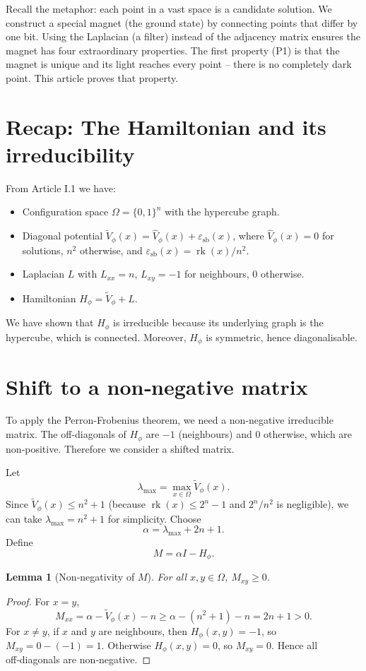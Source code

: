 \documentclass[11pt,a4paper]{article}
\newtheorem{lemma}[theorem]{Lemma}
\begin{document}
Recall the metaphor: each point in a vast space is a candidate solution. We construct a special magnet (the ground state) by connecting points that differ by one bit. Using the Laplacian (a filter) instead of the adjacency matrix ensures the magnet has four extraordinary properties. The first property (P1) is that the magnet is unique and its light reaches every point – there is no completely dark point. This article proves that property.

\section{Recap: The Hamiltonian and its irreducibility}

From Article I.1 we have:
\begin{itemize}
\item Configuration space $\Omega = \{0,1\}^n$ with the hypercube graph.
\item Diagonal potential $\tilde{V}_\phi(x) = \hat{V}_\phi(x) + \varepsilon_{\text{sb}}(x)$, where $\hat{V}_\phi(x)=0$ for solutions, $n^2$ otherwise, and $\varepsilon_{\text{sb}}(x)=\operatorname{rk}(x)/n^2$.
\item Laplacian $L$ with $L_{xx}=n$, $L_{xy}=-1$ for neighbours, $0$ otherwise.
\item Hamiltonian $H_\phi = \tilde{V}_\phi + L$.
\end{itemize}
We have shown that $H_\phi$ is irreducible because its underlying graph is the hypercube, which is connected. Moreover, $H_\phi$ is symmetric, hence diagonalisable.

\section{Shift to a non‑negative matrix}

To apply the Perron‑Frobenius theorem, we need a non‑negative irreducible matrix. The off‑diagonals of $H_\phi$ are $-1$ (neighbours) and $0$ otherwise, which are non‑positive. Therefore we consider a shifted matrix.

Let
\[
\lambda_{\max} = \max_{x\in\Omega} \tilde{V}_\phi(x).
\]
Since $\tilde{V}_\phi(x) \le n^2 + 1$ (because $\operatorname{rk}(x) \le 2^n-1$ and $2^n/n^2$ is negligible), we can take $\lambda_{\max} = n^2 + 1$ for simplicity. Choose
\[
\alpha = \lambda_{\max} + 2n + 1.
\]
Define
\[
M = \alpha I - H_\phi.
\]

\begin{lemma}[Non‑negativity of $M$]
For all $x,y\in\Omega$, $M_{xy} \ge 0$.
\end{lemma}
\begin{proof}
For $x=y$,
\[
M_{xx} = \alpha - \tilde{V}_\phi(x) - n \ge \alpha - (n^2+1) - n = 2n+1 > 0.
\]
For $x\neq y$, if $x$ and $y$ are neighbours, then $H_\phi(x,y) = -1$, so $M_{xy}=0 - (-1)=1$. Otherwise $H_\phi(x,y)=0$, so $M_{xy}=0$. Hence all off‑diagonals are non‑negative.
\end{proof}
\end{document}
